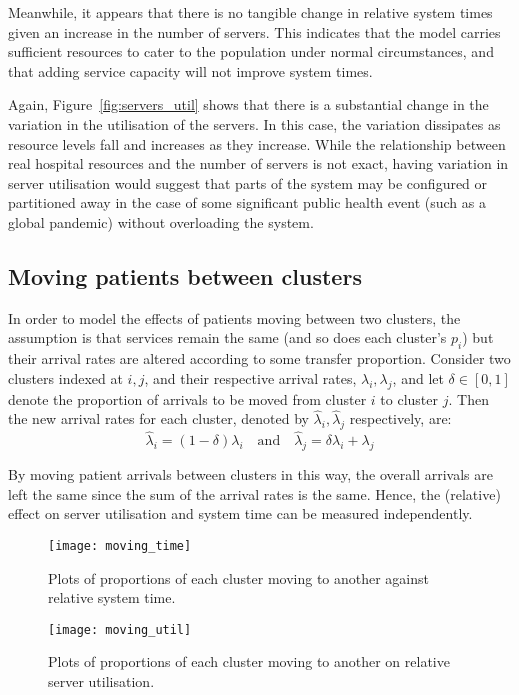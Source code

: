 Meanwhile, it appears that there is no tangible change in relative system times
given an increase in the number of servers. This indicates that the model
carries sufficient resources to cater to the population under normal
circumstances, and that adding service capacity will not improve system times.

Again, Figure~\ref{fig:servers_util} shows that there is a substantial change in
the variation in the utilisation of the servers. In this case, the variation
dissipates as resource levels fall and increases as they increase. While the
relationship between real hospital resources and the number of servers is not
exact, having variation in server utilisation would suggest that parts of the
system may be configured or partitioned away in the case of some significant
public health event (such as a global pandemic) without overloading the system.


\subsection{Moving patients between clusters}\label{subsec:moving}

In order to model the effects of patients moving between two clusters, the
assumption is that services remain the same (and so does each cluster's \(p_i\))
but their arrival rates are altered according to some transfer proportion.
Consider two clusters indexed at \(i, j\), and their respective arrival rates,
\(\lambda_i, \lambda_j\), and let \(\delta \in [0, 1]\) denote the proportion of
arrivals to be moved from cluster \(i\) to cluster \(j\). Then the new arrival
rates for each cluster, denoted by \(\hat\lambda_i, \hat\lambda_j\)
respectively, are:
\begin{equation}\label{eq:moving}
    \hat\lambda_i = \left(1 - \delta\right) \lambda_i
    \quad \text{and} \quad
    \hat\lambda_j = \delta\lambda_i + \lambda_j
\end{equation}

By moving patient arrivals between clusters in this way, the overall arrivals
are left the same since the sum of the arrival rates is the same. Hence, the
(relative) effect on server utilisation and system time can be measured
independently.

\begin{figure}
    \centering
    \texttt{[image: moving\_time]}
    \caption{%
        Plots of proportions of each cluster moving to another against relative
        system time.
    }\label{fig:moving_time}
\end{figure}

\begin{figure}
    \centering
    \texttt{[image: moving\_util]}
    \caption{%
        Plots of proportions of each cluster moving to another on relative
        server utilisation.
    }\label{fig:moving_util}
\end{figure}
